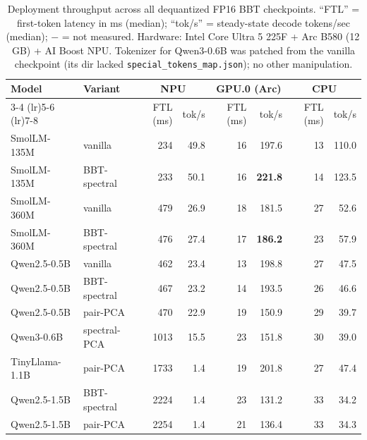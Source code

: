 \documentclass[11pt]{article}
\begin{document}
\begin{table}[t]
\centering
\footnotesize
\caption{Deployment throughput across all dequantized FP16 BBT checkpoints. ``FTL'' = first-token latency in ms (median); ``tok/s'' = steady-state decode tokens/sec (median); $-$ = not measured. Hardware: Intel Core Ultra 5 225F + Arc B580 (12\,GB) + AI Boost NPU. Tokenizer for Qwen3-0.6B was patched from the vanilla checkpoint (its dir lacked \texttt{special\_tokens\_map.json}); no other manipulation.}
\label{tab:device_perf}
\begin{tabular}{ll rr rr rr}
\toprule
\textbf{Model} & \textbf{Variant}
& \multicolumn{2}{c}{\textbf{NPU}} & \multicolumn{2}{c}{\textbf{GPU.0 (Arc)}} & \multicolumn{2}{c}{\textbf{CPU}} \\
\cmidrule(lr){3-4} \cmidrule(lr){5-6} \cmidrule(lr){7-8}
& & FTL (ms) & tok/s & FTL (ms) & tok/s & FTL (ms) & tok/s \\
\midrule
SmolLM-135M  & vanilla       & 234  & 49.8  & 16  & 197.6 & 13 & 110.0 \\
SmolLM-135M  & BBT-spectral  & 233  & 50.1  & 16  & \textbf{221.8} & 14 & 123.5 \\
\addlinespace
SmolLM-360M  & vanilla       & 479  & 26.9  & 18  & 181.5 & 27 & 52.6 \\
SmolLM-360M  & BBT-spectral  & 476  & 27.4  & 17  & \textbf{186.2} & 23 & 57.9 \\
\addlinespace
Qwen2.5-0.5B & vanilla       & 462  & 23.4  & 13  & 198.8 & 27 & 47.5 \\
Qwen2.5-0.5B & BBT-spectral  & 467  & 23.2  & 14  & 193.5 & 26 & 46.6 \\
Qwen2.5-0.5B & pair-PCA      & 470  & 22.9  & 19  & 150.9 & 29 & 39.7 \\
\addlinespace
Qwen3-0.6B   & spectral-PCA  & 1013 & 15.5  & 23  & 151.8 & 30 & 39.0 \\
\addlinespace
TinyLlama-1.1B & pair-PCA    & 1733 & 1.4   & 19  & 201.8 & 27 & 47.4 \\
\addlinespace
Qwen2.5-1.5B & BBT-spectral  & 2224 & 1.4   & 23  & 131.2 & 33 & 34.2 \\
Qwen2.5-1.5B & pair-PCA      & 2254 & 1.4   & 21  & 136.4 & 33 & 34.3 \\
\bottomrule
\end{tabular}
\end{table}
\end{document}
